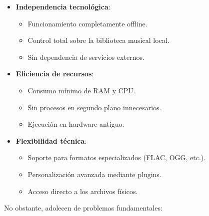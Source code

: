 \documentclass[11pt, a4paper]{article}
\begin{document}
  \begin{itemize}
      \item \textbf{Independencia tecnológica}:
      \begin{itemize}
          \item Funcionamiento completamente offline.
          \item Control total sobre la biblioteca musical local.
          \item Sin dependencia de servicios externos.
      \end{itemize}
      
      \item \textbf{Eficiencia de recursos}:
      \begin{itemize}
          \item Consumo mínimo de RAM y CPU.
          \item Sin procesos en segundo plano innecesarios.
          \item Ejecución en hardware antiguo.
      \end{itemize}
      
      \item \textbf{Flexibilidad técnica}:
      \begin{itemize}
          \item Soporte para formatos especializados (FLAC, OGG, etc.).
          \item Personalización avanzada mediante plugins.
          \item Acceso directo a los archivos físicos.
      \end{itemize}
  \end{itemize}

  No obstante, adolecen de problemas fundamentales:
\end{document}

